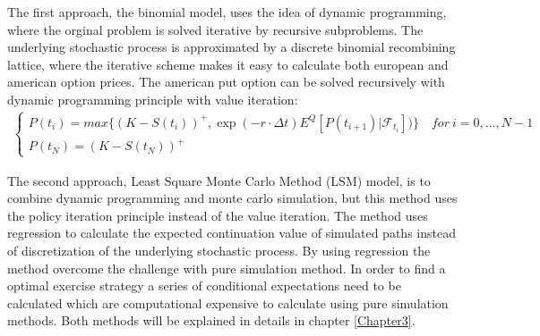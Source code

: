 The first approach, the binomial model, uses the idea of dynamic programming, where the orginal problem is solved iterative by recursive subproblems. The underlying stochastic process is approximated by a discrete binomial recombining lattice, where the iterative scheme makes it easy to calculate both european and american option prices. The american put option can be solved recursively with dynamic programming principle with value iteration: 
\begin{equation}\label{BellmanEq}
\begin{split}
\begin{cases}
          P(t_i) = max\{ (K-S(t_i))^+, \exp(-r\cdot \Delta t) E^Q[P(t_{i+1})|\mathcal{F}_{t_i}])\} \quad for \ i={0,\ldots,N-1} \\
          P(t_N) = (K-S(t_N))^+ 
\end{cases}
\end{split}
\end{equation}

The second approach, Least Square Monte Carlo Method (LSM) model, is to combine dynamic programming and monte carlo simulation, but this method uses the policy iteration principle instead of the value iteration. The method uses regression to calculate the expected continuation value of simulated paths instead of discretization of the underlying stochastic process. By using regression the method overcome the challenge with pure simulation method. In order to find a optimal exercise strategy a series of conditional expectations need to be calculated which are computational expensive to calculate using pure simulation methods. Both methods will be explained in details in chapter \ref{Chapter3}.





